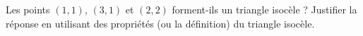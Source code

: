 
\begin{exercice}\label{exoSeconde-0003}

    Les points \( (1,1)\), \( (3,1)\) et \( (2,2)\) forment-ils un triangle isocèle ? Justifier la réponse en utilisant des propriétés (ou la définition) du triangle isocèle.

\end{exercice}
